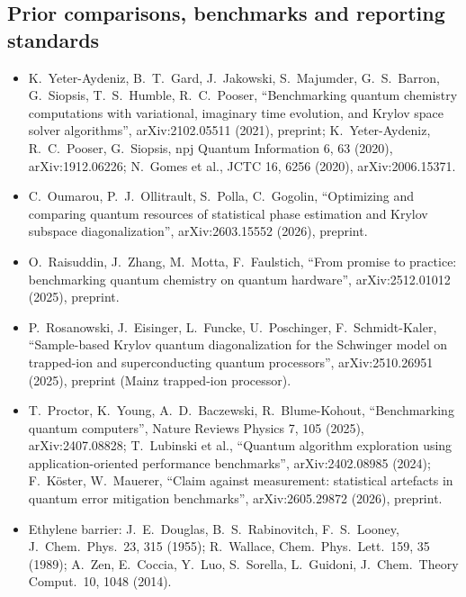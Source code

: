 \documentclass[11pt,a4paper]{article}
\begin{document}
\subsection*{Prior comparisons, benchmarks and reporting standards}
\begin{itemize}\small\sloppy
\item K.~Yeter-Aydeniz, B.~T.~Gard, J.~Jakowski, S.~Majumder, G.~S.~Barron, G.~Siopsis, T.~S.~Humble, R.~C.~Pooser, ``Benchmarking quantum chemistry computations with variational, imaginary time evolution, and Krylov space solver algorithms'', arXiv:2102.05511 (2021), preprint; K.~Yeter-Aydeniz, R.~C.~Pooser, G.~Siopsis, npj Quantum Information 6, 63 (2020), arXiv:1912.06226; N.~Gomes et al., JCTC 16, 6256 (2020), arXiv:2006.15371.
\item C.~Oumarou, P.~J.~Ollitrault, S.~Polla, C.~Gogolin, ``Optimizing and comparing quantum resources of statistical phase estimation and Krylov subspace diagonalization'', arXiv:2603.15552 (2026), preprint.
\item O.~Raisuddin, J.~Zhang, M.~Motta, F.~Faulstich, ``From promise to practice: benchmarking quantum chemistry on quantum hardware'', arXiv:2512.01012 (2025), preprint.
\item P.~Rosanowski, J.~Eisinger, L.~Funcke, U.~Poschinger, F.~Schmidt-Kaler, ``Sample-based Krylov quantum diagonalization for the Schwinger model on trapped-ion and superconducting quantum processors'', arXiv:2510.26951 (2025), preprint (Mainz trapped-ion processor).
\item T.~Proctor, K.~Young, A.~D.~Baczewski, R.~Blume-Kohout, ``Benchmarking quantum computers'', Nature Reviews Physics 7, 105 (2025), arXiv:2407.08828; T.~Lubinski et al., ``Quantum algorithm exploration using application-oriented performance benchmarks'', arXiv:2402.08985 (2024); F.~K\"oster, W.~Mauerer, ``Claim against measurement: statistical artefacts in quantum error mitigation benchmarks'', arXiv:2605.29872 (2026), preprint.
\item Ethylene barrier: J.~E.~Douglas, B.~S.~Rabinovitch, F.~S.~Looney, J.\ Chem.\ Phys.\ 23, 315 (1955); R.~Wallace, Chem.\ Phys.\ Lett.\ 159, 35 (1989); A.~Zen, E.~Coccia, Y.~Luo, S.~Sorella, L.~Guidoni, J.\ Chem.\ Theory Comput.\ 10, 1048 (2014).
\end{itemize}
\end{document}
